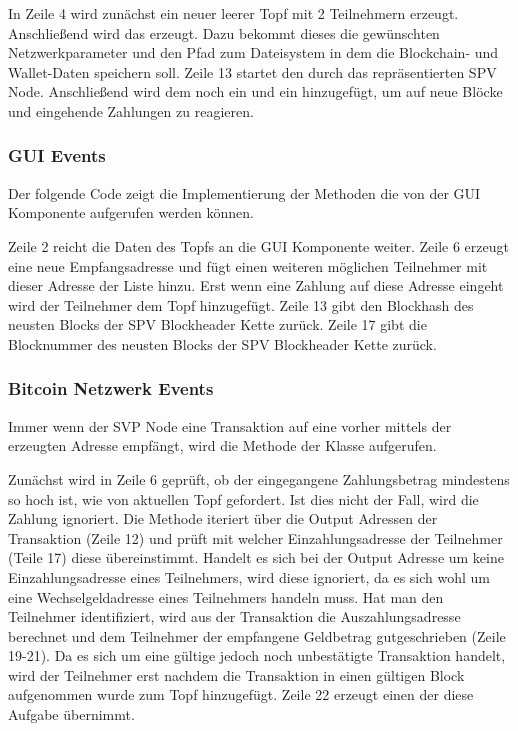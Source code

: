  In Zeile 4 wird zunächst ein neuer leerer Topf mit 2 Teilnehmern erzeugt. Anschließend wird das  erzeugt. Dazu bekommt dieses die gewünschten Netzwerkparameter und den Pfad zum Dateisystem in dem  die Blockchain- und Wallet-Daten speichern soll. Zeile 13 startet den durch das  repräsentierten SPV Node. Anschließend wird dem  noch ein  und ein  hinzugefügt, um auf neue Blöcke und eingehende Zahlungen zu reagieren.

\subsubsection{GUI Events}

Der folgende Code zeigt die Implementierung der Methoden die von der GUI Komponente aufgerufen werden können.

Zeile 2 reicht die Daten des Topfs an die GUI Komponente weiter. Zeile 6 erzeugt eine neue Empfangsadresse und fügt einen weiteren möglichen Teilnehmer mit dieser Adresse der  Liste hinzu. Erst wenn eine Zahlung auf diese Adresse eingeht wird der Teilnehmer dem Topf hinzugefügt. Zeile 13 gibt den Blockhash des neusten Blocks der SPV Blockheader Kette zurück. Zeile 17 gibt die Blocknummer des neusten Blocks der SPV Blockheader Kette zurück.

\subsubsection{Bitcoin Netzwerk Events}

Immer wenn der SVP Node eine Transaktion auf eine vorher mittels der\\  erzeugten Adresse empfängt, wird die  Methode der Klasse  aufgerufen.


Zunächst wird in Zeile 6 geprüft, ob der eingegangene Zahlungsbetrag mindestens so hoch ist, wie von aktuellen Topf gefordert. Ist dies nicht der Fall, wird die Zahlung ignoriert.
Die Methode iteriert über die Output Adressen der Transaktion (Zeile 12) und prüft mit welcher Einzahlungsadresse der Teilnehmer (Teile 17) diese übereinstimmt. Handelt es sich bei der Output Adresse um keine Einzahlungsadresse eines Teilnehmers, wird diese ignoriert, da es sich wohl um eine Wechselgeldadresse eines Teilnehmers handeln muss. Hat man den Teilnehmer identifiziert, wird aus der Transaktion die Auszahlungsadresse berechnet und dem Teilnehmer der empfangene Geldbetrag gutgeschrieben (Zeile 19-21). Da es sich um eine gültige jedoch noch unbestätigte Transaktion handelt, wird der Teilnehmer erst nachdem die Transaktion in einen gültigen Block aufgenommen wurde zum Topf hinzugefügt. Zeile 22 erzeugt einen  der diese Aufgabe übernimmt.

